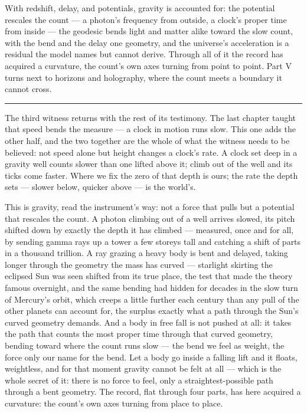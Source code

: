 \bigskip

With redshift, delay, and potentials, gravity is accounted for: the potential rescales the count --- a photon's
frequency from outside, a clock's proper time from inside --- the geodesic bends light and matter alike toward
the slow count, with the bend and the delay one geometry, and the universe's acceleration is a residual the
model names but cannot derive. Through all of it the record has acquired a curvature, the count's own axes
turning from point to point. Part V turns next to horizons and holography, where the count meets a boundary it
cannot cross.

\bigskip
\begin{center}
\rule{0.4\textwidth}{0.4pt}
\end{center}
\bigskip

\noindent The third witness returns with the rest of its testimony. The last chapter taught that speed bends the
measure --- a clock in motion runs slow. This one adds the other half, and the two together are the whole of
what the witness needs to be believed: not speed alone but height changes a clock's rate. A clock set deep in a
gravity well counts slower than one lifted above it; climb out of the well and its ticks come faster. Where we
fix the zero of that depth is ours; the rate the depth sets --- slower below, quicker above --- is the world's.

This is gravity, read the instrument's way: not a force that pulls but a potential that rescales the count. A
photon climbing out of a well arrives slowed, its pitch shifted down by exactly the depth it has climbed ---
measured, once and for all, by sending gamma rays up a tower a few storeys tall and catching a shift of parts in
a thousand trillion. A ray grazing a heavy body is bent and delayed, taking longer through the geometry the mass
has curved --- starlight skirting the eclipsed Sun was seen shifted from its true place, the test that made the
theory famous overnight, and the same bending had hidden for decades in the slow turn of Mercury's orbit, which
creeps a little further each century than any pull of the other planets can account for, the surplus exactly
what a path through the Sun's curved geometry demands. And a body in free fall is not pushed at all: it takes
the path that counts the most proper time through that curved geometry, bending toward where the count runs slow
--- the bend we feel as weight, the force only our name for the bend. Let a body go inside a falling lift and it
floats, weightless, and for that moment gravity cannot be felt at all --- which is the whole secret of it: there
is no force to feel, only a straightest-possible path through a bent geometry. The record, flat through four parts, has here acquired a curvature: the count's own
axes turning from place to place.

